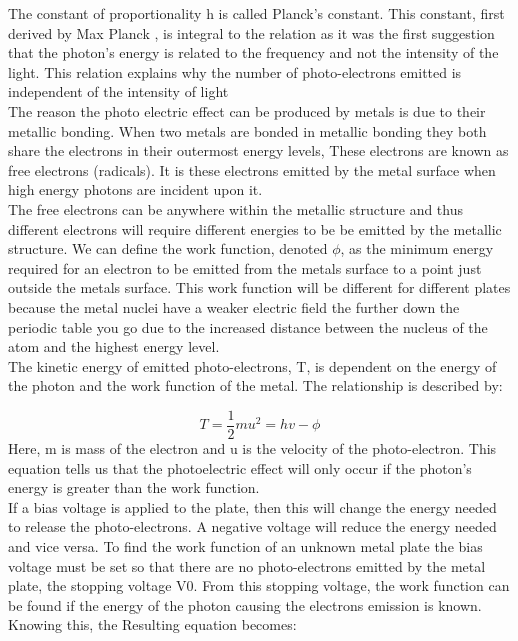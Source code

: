 \documentclass[12pt]{article}
\begin{document}
The constant of proportionality h is called Planck’s constant. This constant, first derived by Max Planck \cite{Planck}, is integral to the relation as it was the first suggestion that the photon’s energy is related to the frequency and not the intensity of the light. This relation explains why the number of photo-electrons emitted is independent of the intensity of light\\

The reason the photo electric effect can be produced by metals is due to their metallic bonding. When two metals are bonded in metallic bonding they both share the electrons in their outermost energy levels, These electrons are known as free electrons (radicals). It is these electrons emitted by the metal surface when  high energy photons are incident upon it.\\

The free electrons can be anywhere within the metallic structure and thus different electrons will require different energies to be be emitted by the metallic structure. We can define the work function, denoted $\phi$, as the minimum energy required for an electron to be emitted from the metals surface to a point just outside the metals surface. This work function will be different for different plates because the metal nuclei have a weaker electric field the further down the periodic table you go due to the increased distance between the nucleus of the atom and the highest energy level.\\

The kinetic energy of emitted photo-electrons, T, is dependent on the energy of the photon and the work function of the metal. The relationship is described by: \cite{university physics}

\begin{equation}
    T=\frac{1}{2}mu^{2}=hv-\phi
\end{equation}
Here, m is mass of the electron and u is the velocity of the photo-electron. This equation tells us that the photoelectric effect will only occur if the photon’s energy is greater than the work function.\\

If a bias voltage is applied to the plate, then this will change the energy needed to release the photo-electrons. A negative voltage will reduce the energy needed and vice versa. To find the work function of an unknown metal plate the bias voltage must be set so that there are no photo-electrons emitted by the metal plate, the stopping voltage V0. From this stopping voltage, the work function can be found if the energy of the photon causing the electrons emission is known. Knowing this, the Resulting equation becomes:
\end{document}
